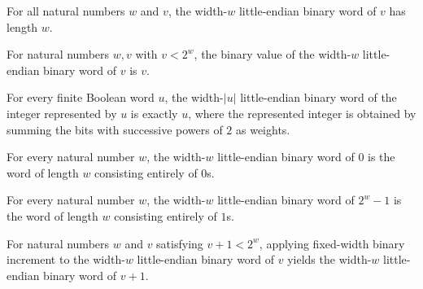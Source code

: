 \begin{theorem}
\label{Complexity.Meyer.length_enumWord}
\leanok
{}
For all natural numbers $w$ and $v$, the width-$w$ little-endian binary word of $v$ has
length $w$.
\end{theorem}

\begin{theorem}
\label{Complexity.Meyer.ctrVal_enumWord}
\leanok
{}
For natural numbers $w,v$ with $v<2^w$, the binary value of the width-$w$ little-endian
binary word of $v$ is $v$.
\end{theorem}

\begin{theorem}
\label{Complexity.Meyer.enumWord_ctrVal}
\leanok
{}
For every finite Boolean word $u$, the width-$|u|$ little-endian binary word of the
integer represented by $u$ is exactly $u$, where the represented integer is obtained by
summing the bits with successive powers of $2$ as weights.
\end{theorem}

\begin{theorem}
\label{Complexity.Meyer.enumWord_zero}
\leanok
{}
For every natural number $w$, the width-$w$ little-endian binary word of $0$ is the word
of length $w$ consisting entirely of $0$s.
\end{theorem}

\begin{theorem}
\label{Complexity.Meyer.enumWord_ones}
\leanok
{}
For every natural number $w$, the width-$w$ little-endian binary word of $2^w-1$ is the
word of length $w$ consisting entirely of $1$s.
\end{theorem}

\begin{theorem}
\label{Complexity.Meyer.incFixed_enumWord}
\leanok
{}
For natural numbers $w$ and $v$ satisfying $v+1<2^w$, applying fixed-width binary
increment to the width-$w$ little-endian binary word of $v$ yields the width-$w$
little-endian binary word of $v+1$.
\end{theorem}

